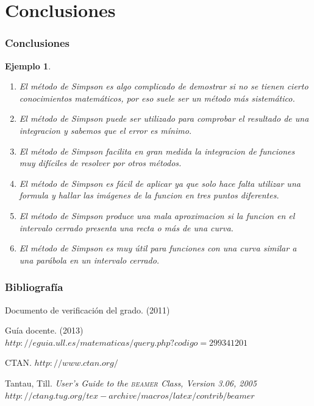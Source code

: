 \documentclass{beamer}
\newcommand{\beamer}{\textsc{beamer}}
\newtheorem{ejemplo}{Ejemplo}
\begin{document}
\section{Conclusiones}

\begin{frame}
\frametitle{Conclusiones}

\begin{ejemplo}
  \begin{enumerate}
    \item
      El método de Simpson es algo complicado de demostrar si no se tienen cierto conocimientos matemáticos, por eso suele ser un método más sistemático.
      \pause
    \item
      El método de Simpson puede ser utilizado para comprobar el resultado de una integracion y sabemos que el error es mínimo.
      \pause
    \item
      El método de Simpson facilita en gran medida la integracion de funciones muy difíciles de resolver por otros métodos.
      \pause
    \item
      El método de Simpson es fácil de aplicar ya que solo hace falta utilizar una formula y hallar las imágenes de la funcion en tres puntos diferentes.
      \pause
    \item El método de Simpson produce una mala aproximacion si la funcion en el intervalo cerrado presenta una recta o más de una curva.
      \pause
    \item El método de Simpson es muy útil para funciones con una curva similar a una parábola en un intervalo cerrado.
      \pause    
      
  \end{enumerate}
\end{ejemplo}

\end{frame}

\begin{frame}
  \frametitle{Bibliografía}

  \begin{thebibliography}{10}

    \beamertemplatebookbibitems
    Documento de verificación del grado. 
    (2011) 

    \beamertemplatebookbibitems
    Guía docente. 
    (2013) 
    {\small $http://eguia.ull.es/matematicas/query.php?codigo=299341201$}

    \beamertemplatebookbibitems
    CTAN. {\small $http://www.ctan.org/$}

    \beamertemplatebookbibitems
    Tantau, Till. 
    \emph{User's Guide to the \beamer{} Class, Version 3.06, 2005} 
    {\small $http://ctang.tug.org/tex-archive/macros/latex/contrib/beamer$}


  \end{thebibliography}
\end{frame}


\end{document}
